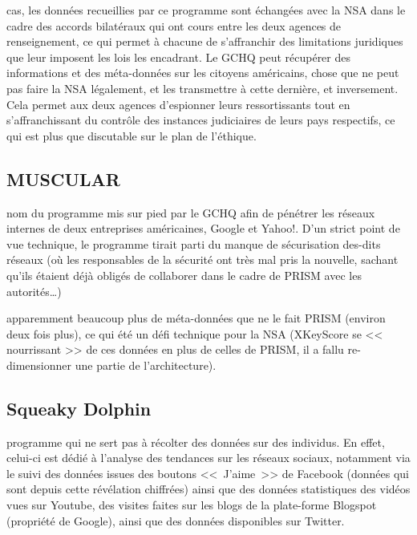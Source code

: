  cas, les données recueillies par ce programme sont
échangées avec la NSA dans le cadre des accords bilatéraux qui ont cours entre
les deux agences de renseignement, ce qui permet à chacune de s'affranchir des
limitations juridiques que leur imposent les lois les encadrant. Le GCHQ peut
récupérer des informations et des méta-données sur les citoyens américains,
chose que ne peut pas faire la NSA légalement, et les transmettre à cette
dernière, et inversement\cite{echange}. Cela permet aux deux agences d'espionner
leurs ressortissants tout en s'affranchissant du contrôle des instances
judiciaires de leurs pays respectifs, ce qui est plus que discutable sur le plan
de l'éthique.

\subsection{MUSCULAR}

 nom du programme mis sur pied par le GCHQ afin de
pénétrer les réseaux internes de deux entreprises américaines, Google et Yahoo!.
D'un strict point de vue technique, le programme tirait parti du manque de
sécurisation des-dits réseaux\cite{echange}\cite{Yahoo} (où les responsables de
la sécurité ont très mal pris la nouvelle, sachant qu'ils étaient déjà obligés de collaborer
dans le cadre de PRISM avec les autorités\ldots)

 apparemment beaucoup plus de méta-données que
ne le fait PRISM (environ deux fois plus\cite{echange}), ce qui été un défi
technique pour la NSA (XKeyScore se << nourrissant >> de ces données en plus de
celles de PRISM, il a fallu re-dimensionner une partie de l'architecture).

\subsection{Squeaky Dolphin}

 programme qui ne sert pas à récolter des données
sur des individus. En effet, celui-ci est dédié à l'analyse des tendances sur
les réseaux sociaux, notamment via le suivi des données issues des boutons
<<~J'aime~>> de Facebook (données qui sont depuis cette révélation
chiffrées\cite{fbenc}) ainsi que des données statistiques des vidéos vues sur
Youtube, des visites faites sur les blogs de la plate-forme Blogspot (propriété
de Google), ainsi que des données disponibles sur Twitter.

